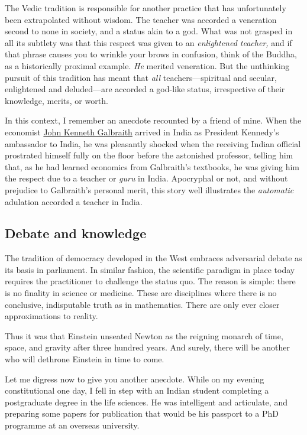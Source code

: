 \documentclass[
  11pt,
  british,
  a4paper,
]{article}
\begin{document}
The Vedic tradition is responsible for another practice that has
unfortunately been extrapolated without wisdom. The teacher was accorded
a veneration second to none in society, and a status akin to a god. What
was not grasped in all its subtlety was that this respect was given to
an \emph{enlightened teacher,} and if that phrase causes you to wrinkle
your brows in confusion, think of the Buddha, as a historically proximal
example. \emph{He} merited veneration. But the unthinking pursuit of
this tradition has meant that \emph{all} teachers---spiritual and
secular, enlightened and deluded---are accorded a god-like status,
irrespective of their knowledge, merits, or worth.

In this context, I remember an anecdote recounted by a friend of mine.
When the economist
\href{http://en.wikipedia.org/wiki/John_Kenneth_Galbraith}{John Kenneth
Galbraith} arrived in India as President Kennedy's ambassador to India,
he was pleasantly shocked when the receiving Indian official prostrated
himself fully on the floor before the astonished professor, telling him
that, as he had learned economics from Galbraith's textbooks, he was
giving him the respect due to a teacher or \emph{guru} in India.
Apocryphal or not, and without prejudice to Galbraith's personal merit,
this story well illustrates the \emph{automatic} adulation accorded a
teacher in India.

\hypertarget{debate-and-knowledge}{%
\subsection{Debate and knowledge}\label{debate-and-knowledge}}

The tradition of democracy developed in the West embraces adversarial
debate as its basis in parliament. In similar fashion, the scientific
paradigm in place today requires the practitioner to challenge the
status quo. The reason is simple: there is no finality in science or
medicine. These are disciplines where there is no conclusive,
indisputable truth as in mathematics. There are only ever closer
approximations to reality.

Thus it was that Einstein unseated Newton as the reigning monarch of
time, space, and gravity after three hundred years. And surely, there
will be another who will dethrone Einstein in time to come.

Let me digress now to give you another anecdote. While on my evening
constitutional one day, I fell in step with an Indian student completing
a postgraduate degree in the life sciences. He was intelligent and
articulate, and preparing some papers for publication that would be his
passport to a PhD programme at an overseas university.
\end{document}
